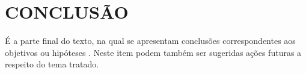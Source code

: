 \chapter{CONCLUS\~AO}
\label{chap:conclusao}
É a parte final do texto, na qual se apresentam conclusões correspondentes aos
objetivos ou hipóteses \cite[p.6]{NBR14724:2005}. Neste item podem também ser sugeridas ações
futuras a respeito do tema tratado.
